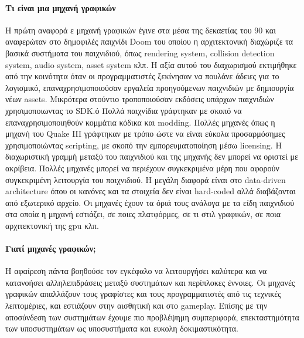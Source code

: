 \documentclass[oneside, 12pt]{book}
\begin{document}
	\paragraph {Τι είναι μια μηχανή γραφικών}
	Η πρώτη αναφορά ε μηχανή γραφικών έγινε στα μέσα της δεκαετίας του 90 και αναφερώταν στο δημοφιλές παιχνίδι Doom του οποίου η αρχιτεκτονική διαχώριζε τα βασικά συστήματα του παιχνιδιού, όπως rendering system, collision detection system, audio system, asset system κλπ. Η αξία αυτού του διαχωρισμού εκτιμήθηκε από την κοινότητα όταν οι προγραμματιστές ξεκίνησαν να πουλάνε άδειες για το λογισμικό, επαναχρησιμοποιούσαν εργαλεία προηγούμενων παιχνιδιών με δημιουργία νέων assets. Μικρότερα στούντιο τροποποιούσαν εκδόσεις υπάρχων παιχνιδιών χρησιμοποιωντας το SDK.ό
	Πολλά παιχνίδια γράφτηκαν με σκοπό να επαναχρησιμοποιηθούν κομμάτια κόδικα και modding. Πολλές μηχανές όπως η μηχανή του Quake III γράφτηκαν με τρόπο ώστε να είναι εύκολα προσαρμόσημες χρησιμοποιώντας scripting, με σκοπό την εμπορευματοποίηση μέσω licensing.
	Η διαχωριστική γραμμή μεταξύ του παιχνιδιού και της μηχανής δεν μπορεί να οριστεί με ακρίβεια. Πολλές μηχανές μπορεί να περιέχουν συγκεκριμένα μέρη που αφορούν συγκεκριμένη λειτουργία του παιχνιδιού. Η μεγάλη διαφορά είναι στο data-driven architecture όπου οι κανόνες και τα στοιχεία δεν είναι hard-coded αλλά διαβάζονται από εξωτερικό αρχείο.
	Οι μηχανές έχουν τα όριά τους ανάλογα με τα είδη παιχνιδιού στα οποία η μηχανή εστιάζει, σε ποιες πλατφόρμες, σε τι στιλ γραφικών, σε ποια αρχιτεκτονική της gpu κλπ. 
	
	\paragraph{Γιατί μηχανές γραφικών;}
	
	Η αφαίρεση πάντα βοηθούσε τον εγκέφαλο να λειτουργήσει καλύτερα και να κατανοήσει αλληλεπιδράσεις μεταξύ συστημάτων και περίπλοκες έννοιες. Οι μηχανές γραφικών απαλλάζουν τους γραφίστες και τους προγραμματιστές από τις τεχνικές λεπτομέριες, και εστιάζουν στην αισθητική και στο gameplay. Επίσης με την αποσύνδεση των συστημάτων έχουμε πιο προβλέψημη συμπεριφορά, επεκταστημότητα των υποσυστημάτων ως υποσυστήματα και ευκολη δοκιμαστικότητα.
	
\end{document}
